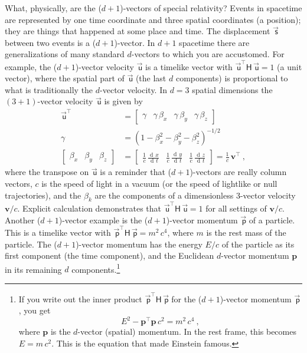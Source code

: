 \documentclass{article}
\newcommand{\metric}{\mathsf{H}}
\DeclareMathOperator{\dd}{d\!}
\newcommand\upvec[1]{\!\vec{\,\mathrm{#1}}}
\newcommand{\Evec}[1]{{\mathbf{#1}}} %
\newcommand{\Lvec}[1]{\upvec{\mathsf{#1}}} %
\newcommand{\plus}{\!+\!} %
\begin{document}
What, physically, are the ($d\plus1$)-vectors of special relativity?
Events in spacetime are represented by one time coordinate and three spatial coordinates (a position); they are things that happened at some place and time.
The displacement $\Lvec{s}$ between two events is a ($d\plus1$)-vector.
In $d\plus1$ spacetime there are generalizations of many standard $d$-vectors to which you are accustomed.
For example,
the ($d\plus1$)-vector velocity $\Lvec{u}$ is a timelike vector with $\Lvec{u}^\top\metric\,\Lvec{u}=1$ (a unit vector), where the spatial part of $\Lvec{u}$ (the last $d$ components) is proportional to what is traditionally the $d$-vector velocity.
In $d=3$ spatial dimensions the $(3\plus1)$-vector velocity $\Lvec{u}$ is given by
\begin{align}
    \Lvec{u}^\top &= \begin{bmatrix} \gamma & \gamma\,\beta_x & \gamma\,\beta_y & \gamma\,\beta_z \end{bmatrix} \\
    \gamma &= (1 - \beta_x^2 - \beta_y^2 - \beta_z^2)^{-1/2} \nonumber\\
    \begin{bmatrix} \beta_x & \beta_y & \beta_z\end{bmatrix} &= \begin{bmatrix}\displaystyle\frac{1}{c}\,\frac{\dd x}{\dd t} & \displaystyle\frac{1}{c}\,\frac{\dd y}{\dd t} & \displaystyle\frac{1}{c}\,\frac{\dd z}{\dd t} \end{bmatrix} = \frac{1}{c}\,\Evec{v}^\top ~,\nonumber
\end{align}
where the transpose on $\Lvec{u}$ is a reminder that ($d\plus1$)-vectors are really column vectors,
$c$ is the speed of light in a vacuum (or the speed of lightlike or null trajectories),
and the $\beta_k$ are the components of a dimensionless 3-vector velocity $\Evec{v}/c$.
Explicit calculation demonstrates that $\Lvec{u}^\top\metric\,\Lvec{u}=1$ for all settings of $\Evec{v}/c$.
Another ($d\plus1$)-vector example is the ($d\plus1$)-vector momentum $\Lvec{p}$ of a particle.
This is a timelike vector with $\Lvec{p}^\top\metric\,\Lvec{p}=m^2\,c^4$, where $m$ is the rest mass of the particle.
The ($d\plus1$)-vector momentum has the energy $E / c$ of the particle as its first component (the time component), and the Euclidean $d$-vector momentum $\Evec{p}$ in its remaining $d$ components.\footnote{%
If you write out the inner product $\Lvec{p}^\top\metric\,\Lvec{p}$ for the ($d\plus1$)-vector momentum $\Lvec{p}$, you get $$E^2 - \Evec{p}^\top\Evec{p}\,c^2 = m^2\,c^4~,$$ where $\Evec{p}$ is the $d$-vector (spatial) momentum. In the rest frame, this becomes $E=m\,c^2$. This is the equation that made Einstein famous.}
\end{document}
